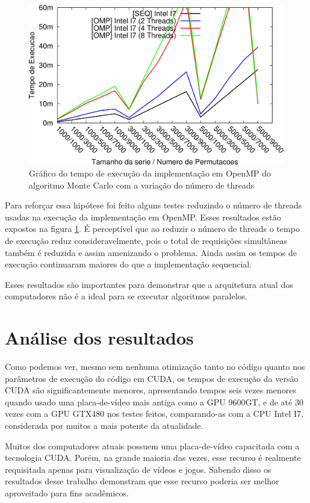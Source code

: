 \begin{figure}[H]
\centering
\includegraphics[]{Imagens/graficos_mcarlo/mcarlo_omp-threads.png}
\caption{Gráfico do tempo de execução da implementação em OpenMP do algoritmo Monte Carlo com a variação do número de threads}
\label{fig:grafico_mcarlo_omp_threads}
\end{figure}

Para reforçar essa hipótese foi feito alguns testes reduzindo o número de threads usadas na execução da implementação em OpenMP. Esses resultados estão expostos na figura \ref{fig:grafico_mcarlo_omp_threads}. É perceptível que ao reduzir o número de threads o tempo de execução reduz consideravelmente, pois o total de requisições simultâneas também é reduzida e assim amenizando o problema. Ainda assim os tempos  de execução continuaram maiores do que a implementação sequencial.

Esses resultados são importantes para demonstrar que a arquitetura atual dos computadores não é a ideal para se executar algoritmos paralelos.

\section{Análise dos resultados}

Como podemos ver, mesmo sem nenhuma otimização tanto no código quanto nos parâmetros de execução do código em CUDA, os tempos de execução da versão CUDA são significantemente menores, apresentando tempos seis vezes menores quando usado uma placa-de-vídeo mais antiga como a GPU 9600GT, e de até 30 vezes com a GPU GTX480 nos testes feitos, comparando-as com a CPU Intel I7, considerada por muitos a mais potente da atualidade.

Muitos dos computadores atuais possuem uma placa-de-vídeo capacitada com a tecnologia CUDA. Porém, na grande maioria das vezes, esse recurso é realmente requisitada apenas para visualização de vídeos e jogos. Sabendo disso os resultados desse trabalho demonstram que esse recurso poderia ser melhor aproveitado para fins acadêmicos.